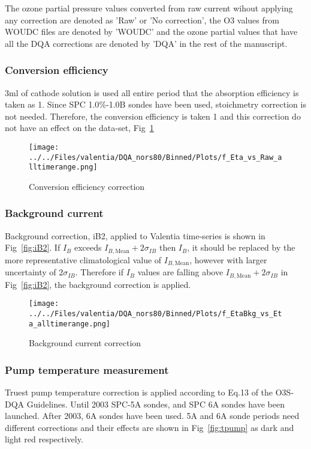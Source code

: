 \documentclass{article}
\begin{document}
The ozone partial pressure values converted from raw current
wihout applying any correction are denoted as 'Raw' or 'No correction', the O3 values from WOUDC files are denoted
by 'WOUDC' and the ozone partial values that have all the DQA corrections
are denoted by 'DQA' in the rest of the manuscript.

%
    \subsubsection{Conversion efficiency}
3ml of cathode solution is used all entire period that the absorption efficiency is taken as 1.
Since SPC 1.0$\%$-1.0B sondes have been used, stoichmetry correction is not needed. Therefore,
the conversion efficiency is taken 1 and this correction do not have an effect on the data-set, Fig~\ref{fig:eta}

%
                \begin{figure}
        \centering
\texttt{[image: ../../Files/valentia/DQA\_nors80/Binned/Plots/f\_Eta\_vs\_Raw\_alltimerange.png]}
    \caption{Conversion efficiency correction}
            \label{fig:eta}
    \end{figure}

        \subsubsection{Background current}
        Background correction, iB2, applied to Valentia time-series is shown in Fig~\ref{fig:iB2}. If $I_B$ exceeds
$I_{B,\text{Mean}}+2\sigma_{IB}$ then $I_B$, it
should be replaced by the more representative climatological value of $I_{B,\text{Mean}}$, however with
larger uncertainty of $2\sigma_{IB}$.
Therefore if $I_B$ values are falling above $I_{B,\text{Mean}}+2\sigma_{IB}$ in Fig~\ref{fig:iB2}, the background correction is applied.
                \begin{figure}
        \centering
\texttt{[image: ../../Files/valentia/DQA\_nors80/Binned/Plots/f\_EtaBkg\_vs\_Eta\_alltimerange.png]}
    \caption{Background current correction}
            \label{fig:bkg}
    \end{figure}
            \subsubsection{Pump temperature measurement}
 Truest pump temperature correction is applied according to Eq.13 of the O3S-DQA Guidelines. Until 2003 SPC-5A sondes,
 and SPC 6A sondes have been launched. After 2003, 6A sondes have been used. 5A and 6A sonde periods need different corrections and
 their effects are shown in Fig~\ref{fig:tpump} as dark and light red respectively.
\end{document}
